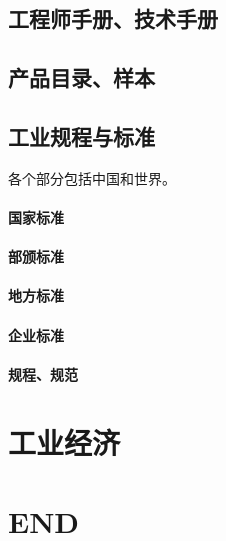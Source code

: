 \documentclass[UTF8]{../../ApplicationUniverse}
\begin{document}
\section{工程师手册、技术手册}
\section{产品目录、样本}

\section{工业规程与标准}
    各个部分包括中国和世界。
    \subsubsection{国家标准}
    \subsubsection{部颁标准}
    \subsubsection{地方标准}
    \subsubsection{企业标准}
    \subsubsection{规程、规范}

\chapter{工业经济}


\chapter{END}
\end{document}
